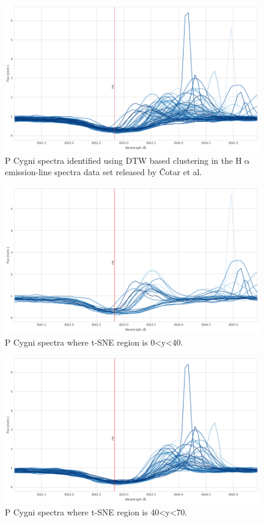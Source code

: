 \begin{figure}[!htb]
\centering
\includegraphics[scale=0.45]{figures/pcygni.png}
\caption{P Cygni spectra identified using DTW based clustering in the H$\upalpha$ emission-line spectra data set released by Čotar et al.}
\end{figure}


\begin{figure}[!htb]
\centering
\includegraphics[scale=0.45]{figures/spectra less than 40.png}
\caption{P Cygni spectra where t-SNE region is 0<y<40. }
\end{figure}

\begin{figure}[!htb]
\centering
\includegraphics[scale=0.45]{figures/spectra greater than 40.png}
\caption{P Cygni spectra where t-SNE region is 40<y<70. }
\end{figure}

